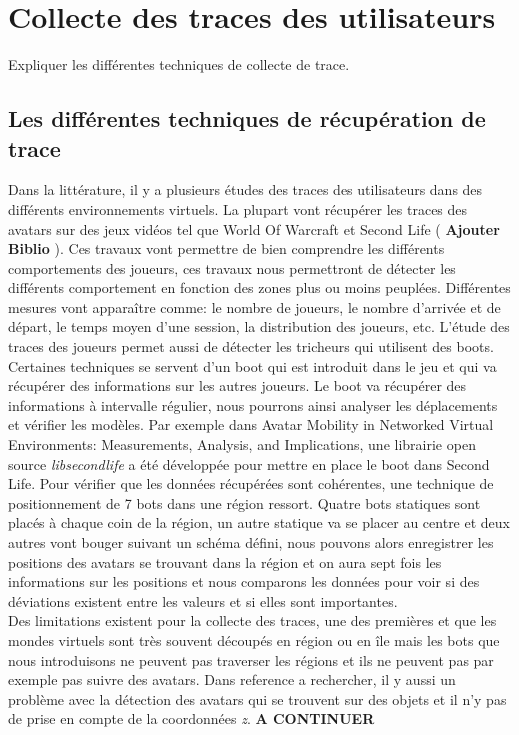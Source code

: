 \section{Collecte des traces des utilisateurs}
	\label{trace}
	Expliquer les différentes techniques de collecte de trace.
	\subsection{Les différentes techniques de récupération de trace}
	Dans la littérature, il y a plusieurs études des traces des utilisateurs dans des différents environnements virtuels. La plupart vont récupérer les traces des avatars sur des jeux vidéos tel que World Of Warcraft et Second Life ( \textbf{Ajouter Biblio} ). Ces travaux vont permettre de bien comprendre les différents comportements des joueurs, ces travaux nous permettront de détecter les différents comportement en fonction des zones plus ou moins peuplées. Différentes mesures vont apparaître comme: le nombre de joueurs, le nombre d'arrivée et de départ, le temps moyen d'une session, la distribution des joueurs, etc. L'étude des traces des joueurs permet aussi de détecter les tricheurs qui utilisent des boots. \\
	
	Certaines techniques se servent d'un boot qui est introduit dans le jeu et qui va récupérer des informations sur les autres joueurs. Le boot va récupérer des informations à intervalle régulier, nous pourrons ainsi analyser les déplacements et vérifier les modèles. Par exemple dans {Avatar Mobility in Networked Virtual Environments: Measurements, Analysis, and Implications}, une librairie open source \textit{libsecondlife} a été développée pour mettre en place le boot dans Second Life. Pour vérifier que les données récupérées sont cohérentes, une technique de positionnement de 7 bots dans une région ressort. Quatre bots statiques sont placés à chaque coin de la région, un autre statique va se placer au centre et deux autres vont bouger suivant un schéma défini, nous pouvons alors enregistrer les positions des avatars se trouvant dans la région et on aura sept fois les informations sur les positions et nous comparons les données pour voir si des déviations existent entre les valeurs et si elles sont importantes.\\  
 	
	Des limitations existent pour la collecte des traces, une des premières et que les mondes virtuels sont très souvent découpés en région ou en île mais les bots que nous introduisons ne peuvent pas traverser les régions et ils ne peuvent pas par exemple pas suivre des avatars. Dans {reference a rechercher}, il y aussi un problème avec la détection des avatars qui se trouvent sur des objets et il n'y pas de prise en compte de la coordonnées \textit{z}. \textbf{A CONTINUER}	

